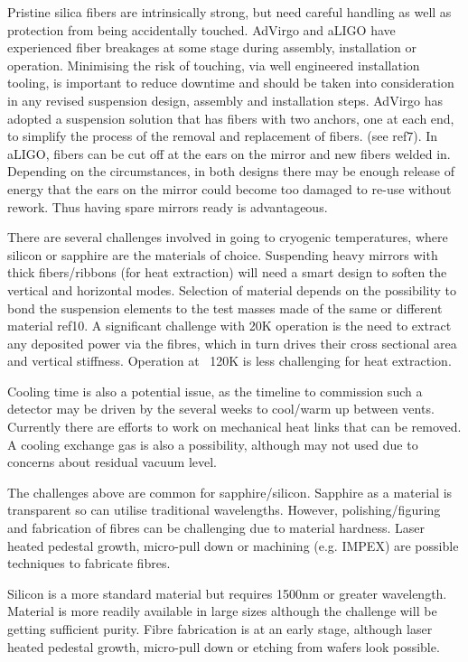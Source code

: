 Pristine silica fibers are intrinsically strong, but need careful handling as well as protection from being accidentally touched. AdVirgo and aLIGO have experienced fiber breakages at some stage during assembly, installation or operation. Minimising the risk of touching, via well engineered installation tooling, is important to reduce downtime and should be taken into consideration in any revised suspension design, assembly and installation steps. AdVirgo has adopted a suspension solution that has fibers with two anchors, one at each end, to simplify the process of the removal and replacement of fibers. (see ref7). In aLIGO, fibers can be cut off at the ears on the mirror and new fibers welded in. Depending on the circumstances, in both designs there may be enough release of energy that the ears on the mirror could become too damaged to re-use without rework. Thus having spare mirrors ready is advantageous. 

There are several challenges involved in going to cryogenic temperatures, where silicon or sapphire are the materials of choice.
Suspending heavy mirrors with thick fibers/ribbons (for heat extraction) will need a smart design to soften the vertical and horizontal modes. Selection of material depends on the possibility to bond the suspension elements to the test masses made of the same or different material ref10. A significant challenge with 20K operation is the need to extract any deposited power via the fibres, which in turn drives their cross sectional area and vertical stiffness. Operation at ~120K is less challenging for heat extraction.

Cooling time is also a potential issue, as the timeline to commission such a detector may be driven by the several weeks to cool/warm up between vents. Currently there are efforts to work on mechanical heat links that can be removed. A cooling exchange gas is also a possibility, although may not used due to concerns about residual vacuum level.

The challenges above are common for sapphire/silicon. Sapphire as a material is transparent so can utilise traditional wavelengths. However, polishing/figuring and fabrication of fibres can be challenging due to material hardness. Laser heated pedestal growth, micro-pull down or machining (e.g. IMPEX) are possible techniques to fabricate fibres.

Silicon is a more standard material but requires 1500nm or greater wavelength. Material is more readily available in large sizes although the challenge will be getting sufficient purity. Fibre fabrication is at an early stage, although laser heated pedestal growth, micro-pull down or etching from wafers look possible.

